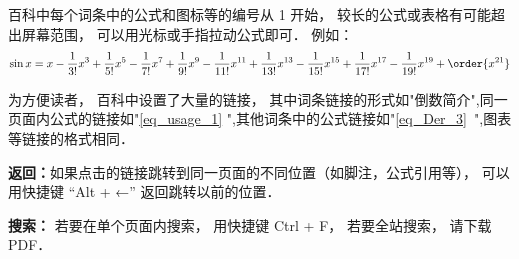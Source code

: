 
\begin{issues}
\issueDraft
\end{issues}

百科中每个词条中的公式和图标等的编号从 1 开始， 较长的公式或表格有可能超出屏幕范围， 可以用光标或手指拉动公式即可． 例如：
\begin{equation}\label{eq_usage_1}
\sin x = x - \frac{1}{3!} x^3 + \frac{1}{5!} x^5 - \frac{1}{7!} x^7+\frac{1}{9!} x^9-\frac{1}{11!} x^{11}+\frac{1}{13!} x^{13}-\frac{1}{15!} x^{15}+\frac{1}{17!} x^{17}-\frac{1}{19!} x^{19}+ \order{x^{21}}
\end{equation}

为方便读者， 百科中设置了大量的链接， 其中词条链接的形式如"倒数简介",同一页面内公式的链接如"\autoref{eq_usage_1} ",其他词条中的公式链接如"\autoref{eq_Der_3}~",图表等链接的格式相同．

\textbf{返回：}如果点击的链接跳转到同一页面的不同位置（如脚注，公式引用等）， 可以用快捷键 “Alt + ←” 返回跳转以前的位置．

\textbf{搜索：} 若要在单个页面内搜索， 用快捷键 Ctrl + F， 若要全站搜索， 请下载 PDF．


